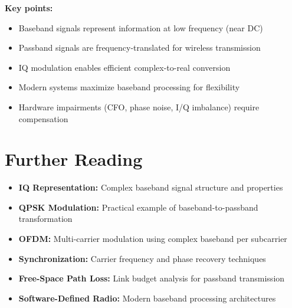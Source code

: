 \textbf{Key points:}
\begin{itemize}
\item Baseband signals represent information at low frequency (near DC)
\item Passband signals are frequency-translated for wireless transmission
\item IQ modulation enables efficient complex-to-real conversion
\item Modern systems maximize baseband processing for flexibility
\item Hardware impairments (CFO, phase noise, I/Q imbalance) require compensation
\end{itemize}

\section{Further Reading}

\begin{itemize}
\item \textbf{IQ Representation:} Complex baseband signal structure and properties
\item \textbf{QPSK Modulation:} Practical example of baseband-to-passband transformation
\item \textbf{OFDM:} Multi-carrier modulation using complex baseband per subcarrier
\item \textbf{Synchronization:} Carrier frequency and phase recovery techniques
\item \textbf{Free-Space Path Loss:} Link budget analysis for passband transmission
\item \textbf{Software-Defined Radio:} Modern baseband processing architectures
\end{itemize}
